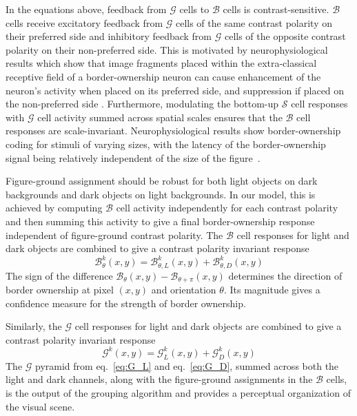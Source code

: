 In the equations above, feedback from $\mathcal{G}$ cells to $\mathcal{B}$ cells is contrast-sensitive. $\mathcal{B}$ cells receive excitatory feedback from $\mathcal{G}$ cells of the same contrast polarity on their preferred side and inhibitory feedback from $\mathcal{G}$ cells of the opposite contrast polarity on their non-preferred side. This is motivated by neurophysiological results which show that image fragments placed within the extra-classical receptive field of a border-ownership neuron can cause enhancement of the
neuron's activity when placed on its preferred side,
and suppression if placed on the non-preferred side
\citep{Zhang_vonderHeydt10}. Furthermore, modulating the bottom-up $\mathcal{S}$ cell
responses with $\mathcal{G}$ cell activity summed across spatial scales
ensures that the $\mathcal{B}$ cell responses are scale-invariant. Neurophysiological results show border-ownership coding for stimuli of varying sizes, with the latency of the border-ownership signal being relatively independent of the size of the figure~\citep{Zhou_etal00,Sugihara_etal11}.

Figure-ground assignment should be robust for both light objects on dark backgrounds and dark objects on light backgrounds. In our model, this is achieved by computing $\mathcal{B}$ cell activity
independently for each contrast polarity and then summing this activity to give
a final border-ownership response independent of figure-ground contrast
polarity. The $\mathcal{B}$ cell responses for light and dark objects are combined to give a contrast polarity invariant response
\begin{equation}
\mathcal{B}^k_{\theta}(x,y) =
\mathcal{B}^k_{\theta,L}(x,y)+\mathcal{B}^k_{\theta,D}(x,y)
\label{eq:BOS}
\end{equation}
The sign of the difference $\mathcal{B}_{\theta}(x,y)-\mathcal{B}_{\theta+\pi}(x,y)$ determines the direction of border
ownership at pixel $(x,y)$ and orientation $\theta$. Its magnitude
gives a confidence measure for the strength of border ownership.

Similarly, the $\mathcal{G}$ cell responses for light and dark objects are combined to give a contrast polarity invariant response
\begin{equation}
\mathcal{G}^k(x,y) =
\mathcal{G}^k_{L}(x,y)+\mathcal{G}^k_{D}(x,y)
\label{eq:G}
\end{equation}
The $\mathcal{G}$ pyramid from eq.~\ref{eq:G_L} and eq.~\ref{eq:G_D}, summed across both the light and dark channels, along with the figure-ground assignments in the $\mathcal{B}$ cells, is the output of the grouping algorithm and provides a perceptual organization of the visual scene.


